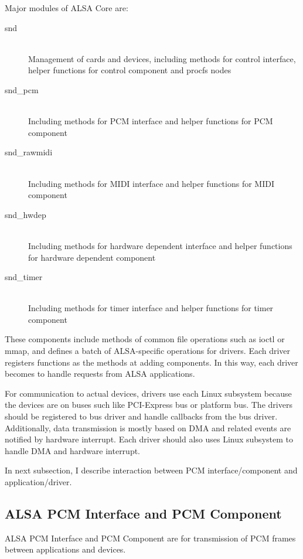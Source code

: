 \documentclass[onecolumn]{article}
\begin{document}
Major modules of ALSA Core are:

\begin{description}
\item[snd] \mbox{} \\
Management of cards and devices, including methods for control interface, helper functions for control component and procfs nodes
\item[snd\_pcm] \mbox{} \\
Including methods for PCM interface and helper functions for PCM component
\item[snd\_rawmidi] \mbox{} \\
Including methods for MIDI interface and helper functions for MIDI component
\item[snd\_hwdep] \mbox{} \\
Including methods for hardware dependent interface and helper functions for hardware dependent component
\item[snd\_timer] \mbox{} \\
Including methods for timer interface and helper functions for timer component
\end{description}

These components include methods of common file operations such as ioctl or mmap, and defines a batch of ALSA-specific operations for drivers. Each driver registers functions as the methods at adding components. In this way, each driver becomes to handle requests from ALSA applications\cite{alsa-driver}.

For communication to actual devices, drivers use each Linux subsystem because the devices are on buses such like PCI-Express bus or platform bus. The drivers should be registered to bus driver and handle callbacks from the bus driver. Additionally, data transmission is mostly based on DMA and related events are notified by hardware interrupt. Each driver should also uses Linux subsystem to handle DMA and hardware interrupt.

In next subsection, I describe interaction between PCM interface/component and application/driver.

\subsection{ALSA PCM Interface and PCM Component}
\label{sec:alsa-pcm}

ALSA PCM Interface and PCM Component are for transmission of PCM frames between applications and devices.
\end{document}
